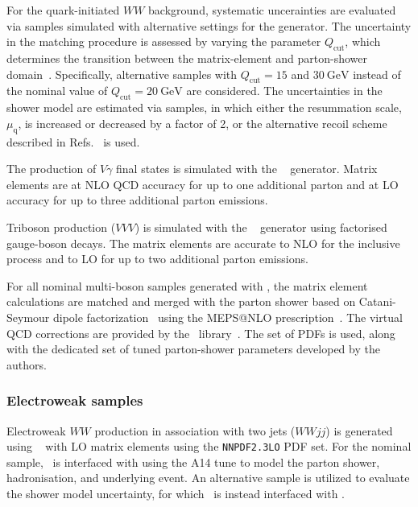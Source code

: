For the quark-initiated $WW$ background, systematic uncerainties are evaluated
via samples simulated with alternative settings for the 
generator. The uncertainty in the matching procedure is assessed by varying the
parameter $Q_\text{cut}$, which determines the transition between the matrix-element
and parton-shower domain~\cite{Hoeche:2009rj}. Specifically, alternative
samples with $Q_\text{cut}=15$ and $\SI{30}{\GeV}$ instead of the nominal value of
$Q_\text{cut}=\SI{20}{\GeV}$ are considered. The uncertainties in the shower
model are estimated via samples, in which either the resummation scale,
$\mu_\text{q}$, is increased or decreased by a factor of 2, or the alternative
recoil scheme described in Refs.~\cite{Schumann:2007mg,Hoeche:2009xc} is used.

The production of $V\gamma$ final states is simulated with the ~\cite{Bothmann:2019yzt} generator.
Matrix elements are at NLO QCD accuracy for up to one additional parton and at LO accuracy for up to three additional parton emissions.

Triboson production ($VVV$) is simulated with the
~\cite{Bothmann:2019yzt} generator using factorised gauge-boson
decays. The matrix elements are accurate to NLO for the inclusive process and
to LO for up to two additional parton emissions.

For all nominal multi-boson samples generated with \SHERPA, the matrix element calculations are matched and merged with the \SHERPA parton shower based on Catani-Seymour dipole factorization~\cite{Gleisberg:2008fv,Schumann:2007mg} using the MEPS@NLO prescription~\cite{Hoeche:2011fd,Hoeche:2012yf,Catani:2001cc,Hoeche:2009rj}.
The virtual QCD corrections are provided by the \openloops\ library~\cite{Cascioli:2011va,Denner:2016kdg}.
The \nnpdfnnlo set of PDFs is used, along with the dedicated set of tuned parton-shower parameters developed by the \SHERPA authors.


\subsubsection{Electroweak samples}
Electroweak $WW$ production in association with two jets ($WWjj$) is
generated using \MGFiveNLO~\cite{Alwall:2014hca} with LO matrix elements using the \texttt{NNPDF2.3LO} PDF set.
For the nominal sample, \MGFiveNLO\ is interfaced with  using the
A14 tune to model the parton shower, hadronisation, and underlying event. An
alternative sample is utilized to evaluate the shower model uncertainty, for
which \MGFiveNLO\ is instead interfaced with .

